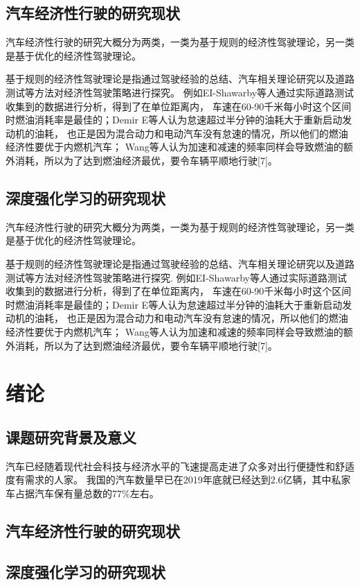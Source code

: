 \section{汽车经济性行驶的研究现状}
\par  汽车经济性行驶的研究大概分为两类，一类为基于规则的经济性驾驶理论，另一类是基于优化的经济性驾驶理论。
\par  基于规则的经济性驾驶理论是指通过驾驶经验的总结、汽车相关理论研究以及道路测试等方法对经济性驾驶策略进行探究。
例如EI-Shawarby等人通过实际道路测试收集到的数据进行分析，得到了在单位距离内，
车速在60-90千米每小时这个区间时燃油消耗率是最佳的；Demir E等人认为怠速超过半分钟的油耗大于重新启动发动机的油耗，
也正是因为混合动力和电动汽车没有怠速的情况，所以他们的燃油经济性要优于内燃机汽车；
Wang等人认为加速和减速的频率同样会导致燃油的额外消耗，所以为了达到燃油经济最优，要令车辆平顺地行驶[7]。

\section{深度强化学习的研究现状}
\par  汽车经济性行驶的研究大概分为两类，一类为基于规则的经济性驾驶理论，另一类是基于优化的经济性驾驶理论。
\par  基于规则的经济性驾驶理论是指通过驾驶经验的总结、汽车相关理论研究以及道路测试等方法对经济性驾驶策略进行探究.
例如EI-Shawarby等人通过实际道路测试收集到的数据进行分析，得到了在单位距离内，
车速在60-90千米每小时这个区间时燃油消耗率是最佳的；Demir E等人认为怠速超过半分钟的油耗大于重新启动发动机的油耗，
也正是因为混合动力和电动汽车没有怠速的情况，所以他们的燃油经济性要优于内燃机汽车；
Wang等人认为加速和减速的频率同样会导致燃油的额外消耗，所以为了达到燃油经济最优，要令车辆平顺地行驶[7]。

\chapter{绪论}
\section{课题研究背景及意义}
汽车已经随着现代社会科技与经济水平的飞速提高走进了众多对出行便捷性和舒适度有需求的人家。
我国的汽车数量早已在2019年底就已经达到2.6亿辆，其中私家车占据汽车保有量总数的77\%左右。
\section{汽车经济性行驶的研究现状}
\section{深度强化学习的研究现状}
